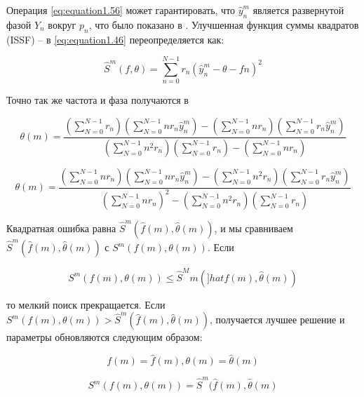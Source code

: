 Операция \ref{eq:equation1.56} может гарантировать, что $\hat{y}^m_n$ является развернутой фазой $Y_n$ вокруг $p_n$, что было показано в \cite{xu2013robust}. Улучшенная функция суммы квадратов (ISSF) -- в \ref{eq:equation1.46} переопределяется как:

\begin{equation}
	\label{eq:equation1.57}
	\hat{S}^m(f,\theta) =\sum^{N-1}_{n=0} r_n(\hat{y}^m_n - \theta-fn)^2
\end{equation}

Точно так же частота и фаза получаются в

\begin{equation}
	\label{eq:equation1.58}
	\theta(m) = \frac{(\sum^{N-1}_{N=0}r_n) (\sum^{N-1}_{N=0}n r_n \hat{y}^m_n)- (\sum^{N-1}_{N=0}n r_n)(\sum^{N-1}_{N=0}r_n \hat{y}^m_n) }                     {(\sum^{N-1}_{N=0}n^2 r_n) (\sum^{N-1}_{N=0}r_n)-(\sum^{N-1}_{N=0}nr_n)}
\end{equation}

\begin{equation}
	\label{eq:equation1.59}
	\theta(m) = \frac{(\sum^{N-1}_{N=0}n r_n) (\sum^{N-1}_{N=0}n r_n \hat{y}^m_n)- (\sum^{N-1}_{N=0}n^2 r_n)(\sum^{N-1}_{N=0}r_n \hat{y}^m_n) }                           {(\sum^{N-1}_{N=0}n r_n)^2 - (\sum^{N-1}_{N=0}n^2 r_n)(\sum^{N-1}_{N=0}r_n)}
\end{equation}

Квадратная ошибка равна $\hat{S}^m (\hat{f}(m), \hat{\theta}(m))$, и мы сравниваем $\hat{S}^m (\hat{f}(m),\hat{\theta}(m))$ с $S^m (f (m), \theta(m))$. Если

\begin{equation}
	\label{eq:equation1.60}
	S^m(f(m),\theta(m))\leq \hat{S}^Mm (]hat{f}(m),\hat{\theta}(m))
\end{equation}

то мелкий поиск прекращается. Если $S^m(f(m), \theta (m)) > \hat{S}^m (\hat{f}(m),\hat{\theta}(m))$, получается лучшее решение и параметры обновляются следующим образом:

\begin{equation}
	\label{eq:equation1.61}
	f(m)=\hat{f}(m),\theta(m)=\hat{\theta}(m)
\end{equation}

\begin{equation}
	\label{eq:equation1.62}
	S^m(f(m),\theta(m))=\hat{S}^m(\hat{f}(m),\hat{\theta}(m)
\end{equation}

